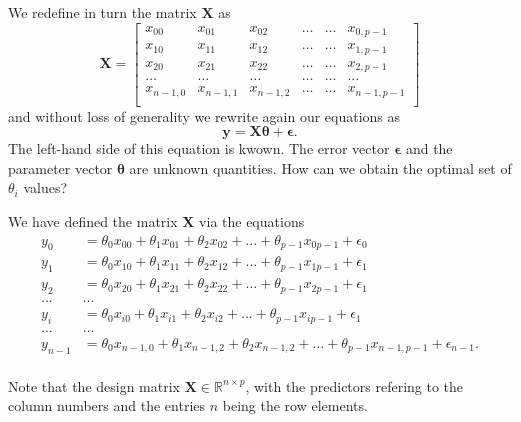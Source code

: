 \documentclass[%
oneside,                 %
final,                   %
10pt]{article}
\newenvironment{block_mdfboxadmon}[1][]{
\begin{block_mdfboxmdframed}[frametitle=#1]
}
{
\end{block_mdfboxmdframed}
}
\begin{document}

\begin{block_mdfboxadmon}[]
We redefine in turn the matrix $\bm{X}$ as
\[
\bm{X}=
\begin{bmatrix} 
x_{00}& x_{01} &x_{02}& \dots & \dots &x_{0,p-1}\\
x_{10}& x_{11} &x_{12}& \dots & \dots &x_{1,p-1}\\
x_{20}& x_{21} &x_{22}& \dots & \dots &x_{2,p-1}\\                      
\dots& \dots &\dots& \dots & \dots &\dots\\
x_{n-1,0}& x_{n-1,1} &x_{n-1,2}& \dots & \dots &x_{n-1,p-1}\\
\end{bmatrix} 
\]
and without loss of generality we rewrite again our equations as
\[
\bm{y} = \bm{X}\bm{\theta}+\bm{\epsilon}.
\]
The left-hand side of this equation is kwown. The error vector $\bm{\epsilon}$ and the parameter vector $\bm{\theta}$ are unknown quantities. How can we obtain the optimal set of $\theta_i$ values?
\end{block_mdfboxadmon} %





\begin{block_mdfboxadmon}[]
We have defined the matrix $\bm{X}$ via the equations
\begin{align*}
y_0&=\theta_0x_{00}+\theta_1x_{01}+\theta_2x_{02}+\dots+\theta_{p-1}x_{0p-1}+\epsilon_0\\
y_1&=\theta_0x_{10}+\theta_1x_{11}+\theta_2x_{12}+\dots+\theta_{p-1}x_{1p-1}+\epsilon_1\\
y_2&=\theta_0x_{20}+\theta_1x_{21}+\theta_2x_{22}+\dots+\theta_{p-1}x_{2p-1}+\epsilon_1\\
\dots & \dots \\
y_{i}&=\theta_0x_{i0}+\theta_1x_{i1}+\theta_2x_{i2}+\dots+\theta_{p-1}x_{ip-1}+\epsilon_1\\
\dots & \dots \\
y_{n-1}&=\theta_0x_{n-1,0}+\theta_1x_{n-1,2}+\theta_2x_{n-1,2}+\dots+\theta_{p-1}x_{n-1,p-1}+\epsilon_{n-1}.\\
\end{align*}

Note that the design matrix 
 $\bm{X}\in {\mathbb{R}}^{n\times p}$, with the predictors refering to the column numbers and the entries $n$ being the row elements.
\end{block_mdfboxadmon} %
\end{document}
